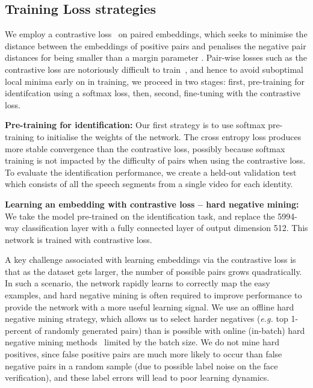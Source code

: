 \documentclass[a4paper]{article}
\def\newpara{\vspace{2pt}}
\def\subsec{\vspace{-5pt}}
\begin{document}
\subsection{Training Loss strategies}
\subsec
\label{sec:trainingloss}
We employ a contrastive loss~\cite{Chopra05,hadsell2006dimensionality}
on paired embeddings, which seeks to minimise the distance between the
embeddings of positive pairs and penalises the negative pair distances
for being smaller than a margin parameter . Pair-wise losses
such as the contrastive loss are notoriously difficult to
train~\cite{hermans2017defense}, and hence to avoid suboptimal local
minima early on in training, we proceed in two stages:
first, pre-training for identifcation using a softmax loss, then,
second, fine-tuning with the contrastive loss.

\newpara\noindent\textbf{Pre-training for identification:} Our first strategy is to use  softmax pre-training to initialise the weights of the network. The cross entropy
loss produces more stable convergence than the contrastive loss, possibly because softmax training is not impacted by the 
difficulty of pairs when using the contrastive loss. To evaluate the identification performance, we create a held-out validation test which consists of all the speech segments from a single video for each identity. 

\newpara\noindent\textbf{Learning an embedding with contrastive loss -- hard negative mining:} 
We take the model pre-trained on the identification task, and replace the 5994-way classification layer with a fully connected layer of output dimension 512. This network is trained with contrastive loss.

A key challenge associated with learning embeddings via the contrastive loss is that as the dataset gets larger, the number of possible pairs grows quadratically. In such a scenario, the network rapidly learns to correctly map the easy examples, and hard negative mining  is often required to improve performance to provide the network with a more useful learning signal. We use an offline hard negative mining strategy, which allows us to select harder negatives ({\em e.g.} top 1-percent of randomly generated pairs) than is possible with online (in-batch) hard negative mining methods~\cite{sung1996learning,hermans2017defense,song2016deep} limited by the batch size. We do not mine hard positives, since false positive pairs are much more likely to occur than false negative pairs in a random sample (due to possible label noise on the face verification), and these label errors will lead to poor learning dynamics.
\end{document}
